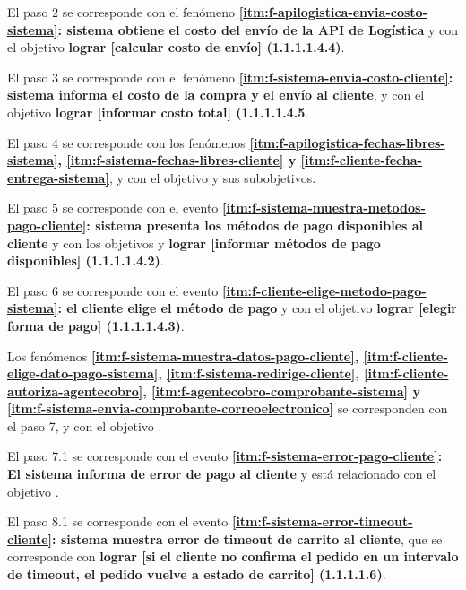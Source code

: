 El paso 2 se corresponde con el fenómeno \textbf{\ref{itm:f-apilogistica-envia-costo-sistema}: sistema obtiene el costo del envío de la API de Logística} y con el objetivo \textbf{lograr [calcular costo de envío] (1.1.1.1.4.4)}.

El paso 3 se corresponde con el fenómeno \textbf{\ref{itm:f-sistema-envia-costo-cliente}: sistema informa el costo de la compra y el envío al cliente}, y con el objetivo \textbf{lograr [informar costo total] (1.1.1.1.4.5}.

El paso 4 se corresponde con los fenómenos \textbf{\ref{itm:f-apilogistica-fechas-libres-sistema}, \ref{itm:f-sistema-fechas-libres-cliente} y \ref{itm:f-cliente-fecha-entrega-sistema}}, y con el objetivo \textbf{} y sus subobjetivos.

El paso 5 se corresponde con el evento \textbf{\ref{itm:f-sistema-muestra-metodos-pago-cliente}: sistema presenta los métodos de pago disponibles al cliente} y con los objetivos \textbf{} y \textbf{lograr [informar métodos de pago disponibles] (1.1.1.1.4.2)}.

El paso 6 se corresponde con el evento \textbf{\ref{itm:f-cliente-elige-metodo-pago-sistema}: el cliente elige el método de pago} y con el objetivo \textbf{lograr [elegir forma de pago] (1.1.1.1.4.3)}.

Los fenómenos \textbf{\ref{itm:f-sistema-muestra-datos-pago-cliente}, \ref{itm:f-cliente-elige-dato-pago-sistema},  \ref{itm:f-sistema-redirige-cliente}, \ref{itm:f-cliente-autoriza-agentecobro}, \ref{itm:f-agentecobro-comprobante-sistema} y \ref{itm:f-sistema-envia-comprobante-correoelectronico}} se corresponden con el paso 7, y con el objetivo \textbf{}. 

El paso 7.1 se corresponde con el evento \textbf{\ref{itm:f-sistema-error-pago-cliente}: El sistema informa de error de pago al cliente} y está relacionado con el objetivo \textbf{}.

El paso 8.1 se corresponde con el evento \textbf{\ref{itm:f-sistema-error-timeout-cliente}: sistema muestra error de timeout de carrito al cliente}, que se corresponde con \textbf{lograr [si el cliente no confirma el pedido en un intervalo de timeout, el pedido vuelve a estado de carrito] (1.1.1.1.6)}.

%
%
\begin{casodeuso}
  \cupost{}
\end{casodeuso}

